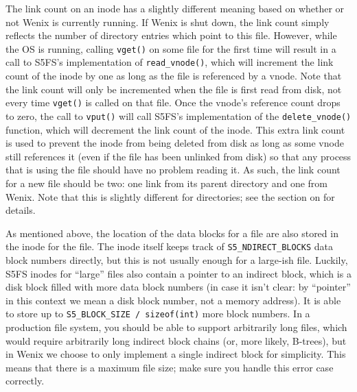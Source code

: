 The link count on an inode has a slightly different meaning based on whether or not Wenix is currently running. If Wenix is shut down, the link count simply reflects the number of directory entries which point to this file. However, while the OS is running, calling \texttt{vget()} on some file for the first time will result in a call to S5FS's implementation of \texttt{read\_vnode()}, which will increment the link count of the inode by one as long as the file is referenced by a vnode. Note that the link count will only be incremented when the file is first read from disk, not every time \texttt{vget()} is called on that file. Once the vnode's reference count drops to zero, the call to \texttt{vput()} will call S5FS's implementation of the \texttt{delete\_vnode()} function, which will decrement the link count of the inode. This extra link count is used to prevent the inode from being deleted from disk as long as some vnode still references it (even if the file has been unlinked from disk) so that any process that is using the file should have no problem reading it. As such, the link count for a new file should be two: one link from its parent directory and one from Wenix. Note that this is slightly different for directories; see the section on  for details.

As mentioned above, the location of the data blocks for a file are also stored in the inode for the file. The inode itself keeps track of \texttt{S5\_NDIRECT\_BLOCKS} data block numbers directly, but this is not usually enough for a large-ish file. Luckily, S5FS inodes for ``large'' files also contain a pointer to an indirect block, which is a disk block filled with more data block numbers (in case it isn't clear: by ``pointer'' in this context we mean a disk block number, not a memory address). It is able to store up to \texttt{S5\_BLOCK\_SIZE / sizeof(int)} more block numbers. In a production file system, you should be able to support arbitrarily long files, which would require arbitrarily long indirect block chains (or, more likely, B-trees), but in Wenix we choose to only implement a single indirect block for simplicity. This means that there is a maximum file size; make sure you handle this error case correctly.

